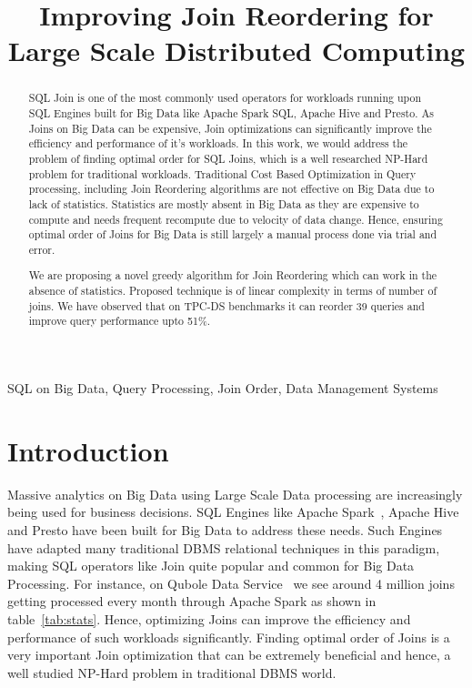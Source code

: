 \documentclass[conference]{IEEEtran}
\begin{document}
\title{Improving Join Reordering for Large Scale Distributed Computing\\
}

\author{
\and
{}
}

\maketitle

\begin{abstract}
SQL Join is one of the most commonly used operators for workloads running upon SQL Engines built for Big Data like Apache Spark SQL, Apache Hive and Presto. As Joins on Big Data can be expensive, Join optimizations can significantly improve the efficiency and performance of it's workloads. In this work, we would address the problem of finding optimal order for SQL Joins, which is a well researched NP-Hard problem for traditional workloads. Traditional Cost Based Optimization in Query processing, including Join Reordering algorithms are not effective on Big Data due to lack of statistics. Statistics are mostly absent in Big Data as they are expensive to compute and needs frequent recompute due to velocity of data change. Hence, ensuring optimal order of Joins for Big Data is still largely a manual process done via trial and error.

We are proposing a novel greedy algorithm for Join Reordering which can work in the absence of statistics. Proposed technique is of linear complexity in terms of number of joins. We have observed that on TPC-DS benchmarks it can reorder 39 queries and improve query performance upto 51\%.
\end{abstract}

\begin{IEEEkeywords}
SQL on Big Data, Query Processing, Join Order, Data Management Systems
\end{IEEEkeywords}

\section{Introduction}
\label{sec:intro} 
Massive analytics on Big Data using Large Scale Data processing are increasingly being used for business decisions. SQL Engines like Apache Spark~\cite{b9}, Apache Hive~\cite{b10} and Presto have been built for Big Data to address these needs. Such Engines have adapted many traditional DBMS relational techniques in this paradigm, making SQL operators like Join quite popular and common for Big Data Processing. For instance, on Qubole Data Service~\cite{b15} we see around 4 million joins getting processed every month through Apache Spark as shown in table~\ref{tab:stats}. Hence, optimizing Joins can improve the efficiency and performance of such workloads significantly. Finding optimal order of Joins is a very important Join optimization that can be extremely beneficial and hence, a well studied NP-Hard problem in traditional DBMS world.
\end{document}
